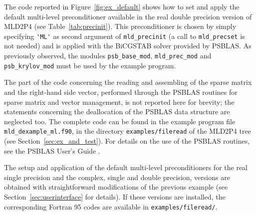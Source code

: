 The code reported in Figure~\ref{fig:ex_default} shows how to set and apply the default
multi-level preconditioner available in the real double precision version
of MLD2P4 (see Table~\ref{tab:precinit}). This preconditioner is chosen
by simply specifying \verb|'ML'| as second argument of \verb|mld_precinit|
(a call to \verb|mld_precset| is not needed) and is applied with the BiCGSTAB
solver provided by PSBLAS. As previously observed, the modules \verb|psb_base_mod|,
\verb|mld_prec_mod| and \verb|psb_krylov_mod| must be used by the example program.
 
The part of the code concerning the
reading and assembling of the sparse matrix and the right-hand side vector, performed
through the PSBLAS routines for sparse matrix and vector management, is not reported
here for brevity; the statements concerning the deallocation of the PSBLAS
data structure are neglected too.
The complete code can be found in the example program file \verb|mld_dexample_ml.f90|,
in the directory \verb|examples/fileread| of the MLD2P4 tree (see
Section~\ref{sec:ex_and_test}).
For details on the use of the PSBLAS routines, see the PSBLAS User's
Guide \cite{PSBLASGUIDE}.

The setup and application of the default multi-level
preconditioners for the real single precision and the complex, single and double
precision, versions are obtained with straightforward modifications of the previous
example (see Section~\ref{sec:userinterface} for details). If these versions are installed,
the corresponding Fortran 95 codes are available in \verb|examples/fileread/|.

